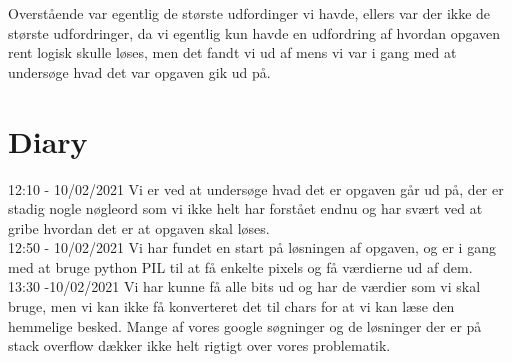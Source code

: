 \documentclass{report}
\begin{document}
Overstående var egentlig de største udfordinger vi havde, ellers var der ikke de største udfordringer, da vi egentlig kun havde en udfordring af hvordan opgaven rent logisk skulle løses, men det fandt vi ud af mens vi var i gang med at undersøge hvad det var opgaven gik ud på. 

\section*{Diary}

12:10 - 10/02/2021
Vi er ved at undersøge hvad det er opgaven går ud på, der er stadig nogle nøgleord som vi ikke helt har forstået endnu og har svært ved at gribe hvordan det er at opgaven skal løses. \\

12:50 - 10/02/2021
Vi har fundet en start på løsningen af opgaven, og er i gang med at bruge python PIL til at få enkelte pixels og få værdierne ud af dem. \\

13:30 -10/02/2021
Vi har kunne få alle bits ud og har de værdier som vi skal bruge, men vi kan ikke få konverteret det til chars for at vi kan læse den hemmelige besked. Mange af vores google søgninger og de løsninger der er på stack overflow dækker ikke helt rigtigt over vores problematik. \\
\end{document}
